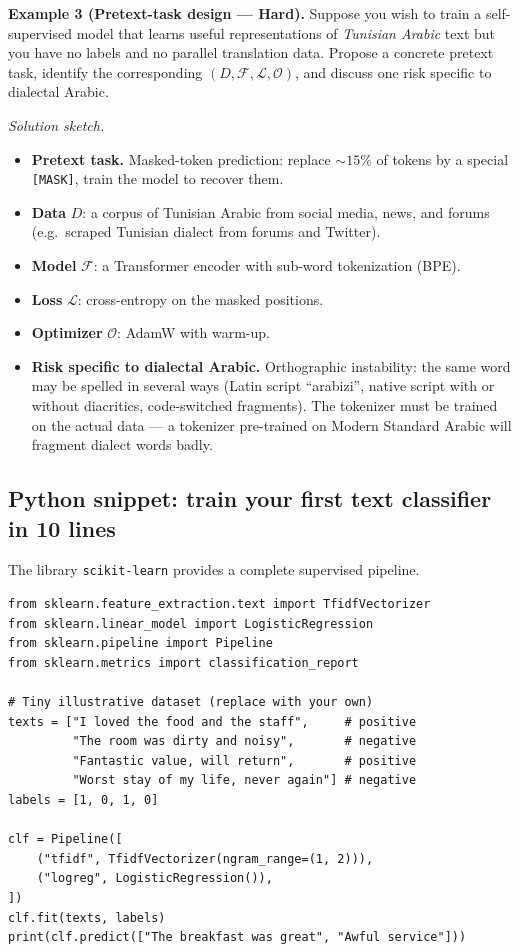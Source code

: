\medskip

\textbf{Example 3 (Pretext-task design --- Hard).}
Suppose you wish to train a self-supervised model that learns useful representations of \emph{Tunisian Arabic} text but you have no labels and no parallel translation data. Propose a concrete pretext task, identify the corresponding $(D, \mathcal{F}, \mathcal{L}, \mathcal{O})$, and discuss one risk specific to dialectal Arabic.

\textit{Solution sketch.}
\begin{itemize}
    \item \textbf{Pretext task.} Masked-token prediction: replace $\sim 15\%$ of tokens by a special \texttt{[MASK]}, train the model to recover them.
    \item \textbf{Data} $D$: a corpus of Tunisian Arabic from social media, news, and forums (e.g.\ scraped Tunisian dialect from forums and Twitter).
    \item \textbf{Model} $\mathcal{F}$: a Transformer encoder with sub-word tokenization (BPE).
    \item \textbf{Loss} $\mathcal{L}$: cross-entropy on the masked positions.
    \item \textbf{Optimizer} $\mathcal{O}$: AdamW with warm-up.
    \item \textbf{Risk specific to dialectal Arabic.} Orthographic instability: the same word may be spelled in several ways (Latin script ``arabizi'', native script with or without diacritics, code-switched fragments). The tokenizer must be trained on the actual data --- a tokenizer pre-trained on Modern Standard Arabic will fragment dialect words badly.
\end{itemize}

\subsection{Python snippet: train your first text classifier in 10 lines}

The library \texttt{scikit-learn} provides a complete supervised pipeline.

\begin{lstlisting}
from sklearn.feature_extraction.text import TfidfVectorizer
from sklearn.linear_model import LogisticRegression
from sklearn.pipeline import Pipeline
from sklearn.metrics import classification_report

# Tiny illustrative dataset (replace with your own)
texts = ["I loved the food and the staff",     # positive
         "The room was dirty and noisy",       # negative
         "Fantastic value, will return",       # positive
         "Worst stay of my life, never again"] # negative
labels = [1, 0, 1, 0]

clf = Pipeline([
    ("tfidf", TfidfVectorizer(ngram_range=(1, 2))),
    ("logreg", LogisticRegression()),
])
clf.fit(texts, labels)
print(clf.predict(["The breakfast was great", "Awful service"]))
\end{lstlisting}

